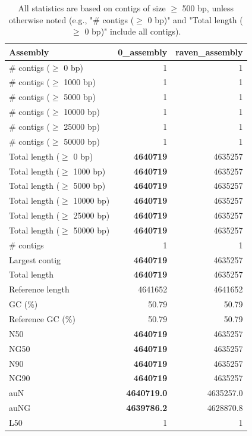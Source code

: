 \documentclass[12pt,a4paper]{article}
\begin{document}
\begin{table}[ht]
\begin{center}
\caption{All statistics are based on contigs of size $\geq$ 500 bp, unless otherwise noted (e.g., "\# contigs ($\geq$ 0 bp)" and "Total length ($\geq$ 0 bp)" include all contigs).}
\begin{tabular}{|l*{2}{|r}|}
\hline
Assembly & 0\_assembly & raven\_assembly \\ \hline
\# contigs ($\geq$ 0 bp) & 1 & 1 \\ \hline
\# contigs ($\geq$ 1000 bp) & 1 & 1 \\ \hline
\# contigs ($\geq$ 5000 bp) & 1 & 1 \\ \hline
\# contigs ($\geq$ 10000 bp) & 1 & 1 \\ \hline
\# contigs ($\geq$ 25000 bp) & 1 & 1 \\ \hline
\# contigs ($\geq$ 50000 bp) & 1 & 1 \\ \hline
Total length ($\geq$ 0 bp) & {\bf 4640719} & 4635257 \\ \hline
Total length ($\geq$ 1000 bp) & {\bf 4640719} & 4635257 \\ \hline
Total length ($\geq$ 5000 bp) & {\bf 4640719} & 4635257 \\ \hline
Total length ($\geq$ 10000 bp) & {\bf 4640719} & 4635257 \\ \hline
Total length ($\geq$ 25000 bp) & {\bf 4640719} & 4635257 \\ \hline
Total length ($\geq$ 50000 bp) & {\bf 4640719} & 4635257 \\ \hline
\# contigs & 1 & 1 \\ \hline
Largest contig & {\bf 4640719} & 4635257 \\ \hline
Total length & {\bf 4640719} & 4635257 \\ \hline
Reference length & 4641652 & 4641652 \\ \hline
GC (\%) & 50.79 & 50.79 \\ \hline
Reference GC (\%) & 50.79 & 50.79 \\ \hline
N50 & {\bf 4640719} & 4635257 \\ \hline
NG50 & {\bf 4640719} & 4635257 \\ \hline
N90 & {\bf 4640719} & 4635257 \\ \hline
NG90 & {\bf 4640719} & 4635257 \\ \hline
auN & {\bf 4640719.0} & 4635257.0 \\ \hline
auNG & {\bf 4639786.2} & 4628870.8 \\ \hline
L50 & 1 & 1 \\ \hline

\end{tabular}
\end{center}
\end{table}
\end{document}
